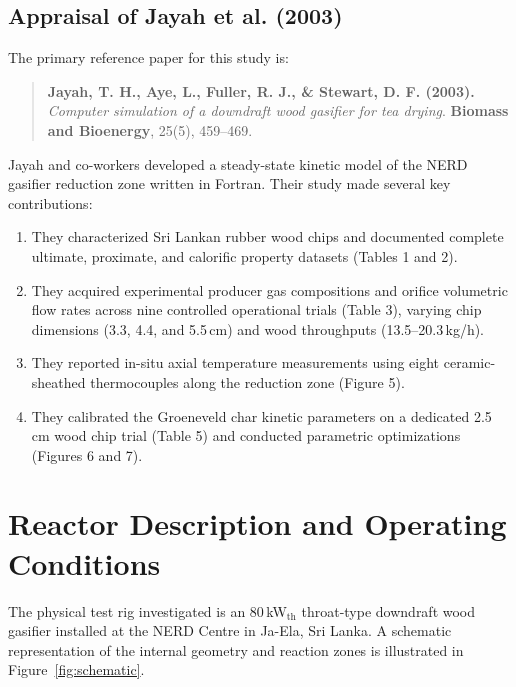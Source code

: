 \documentclass[11pt,a4paper]{article}
\begin{document}
\subsection{Appraisal of Jayah et al. (2003)}
The primary reference paper for this study is:
\begin{quote}
    \textbf{Jayah, T. H., Aye, L., Fuller, R. J., \& Stewart, D. F. (2003).} \textit{Computer simulation of a downdraft wood gasifier for tea drying}. \textbf{Biomass and Bioenergy}, 25(5), 459--469.
\end{quote}
Jayah and co-workers developed a steady-state kinetic model of the NERD gasifier reduction zone written in Fortran. Their study made several key contributions:
\begin{enumerate}[leftmargin=1.5em]
    \item They characterized Sri Lankan rubber wood chips and documented complete ultimate, proximate, and calorific property datasets (Tables 1 and 2).
    \item They acquired experimental producer gas compositions and orifice volumetric flow rates across nine controlled operational trials (Table 3), varying chip dimensions (3.3, 4.4, and 5.5\,cm) and wood throughputs (13.5--20.3\,kg/h).
    \item They reported in-situ axial temperature measurements using eight ceramic-sheathed thermocouples along the reduction zone (Figure 5).
    \item They calibrated the Groeneveld char kinetic parameters on a dedicated 2.5\,cm wood chip trial (Table 5) and conducted parametric optimizations (Figures 6 and 7).
\end{enumerate}

\section{Reactor Description and Operating Conditions}
The physical test rig investigated is an 80\,kW$_{\text{th}}$ throat-type downdraft wood gasifier installed at the NERD Centre in Ja-Ela, Sri Lanka. A schematic representation of the internal geometry and reaction zones is illustrated in Figure~\ref{fig:schematic}.
\end{document}
